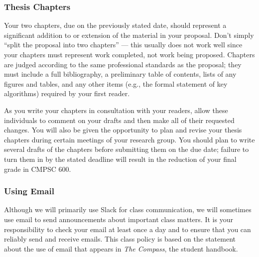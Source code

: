 \documentclass[11pt]{article}
\begin{document}
\subsubsection*{Thesis Chapters}

Your two chapters, due on the previously stated date, should represent a
significant addition to or extension of the material in your proposal. Don't
simply ``split the proposal into two chapters'' --- this usually does not work
well since your chapters must represent work completed, not work being proposed.
Chapters are judged according to the same professional standards as the
proposal; they must include a full bibliography, a preliminary table of
contents, lists of any figures and tables, and any other items (e.g., the formal
statement of key algorithms) required by your first reader.

As you write your chapters in consultation with your readers, allow these
individuals to comment on your drafts and then make all of their requested
changes. You will also be given the opportunity to plan and revise your thesis
chapters during certain meetings of your research group. You should plan to
write several drafts of the chapters before submitting them on the due date;
failure to turn them in by the stated deadline will result in the reduction of
your final grade in CMPSC 600.



\subsubsection*{Using Email}

Although we will primarily use Slack for class communication, we will sometimes
use email to send announcements about important class matters. It is your
responsibility to check your email at least once a day and to ensure that you
can reliably send and receive emails. This class policy is based on the
statement about the use of email that appears in {\em The Compass}, the student
handbook.
\end{document}
